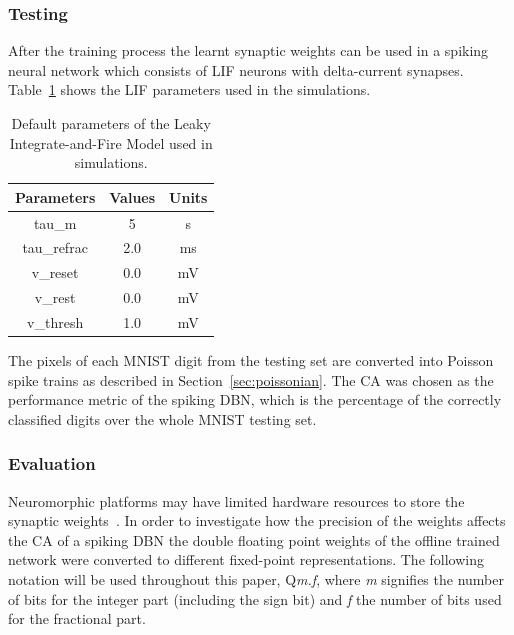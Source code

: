 \documentclass{frontiersENG} %
\begin{document}
\subsubsection{Testing}
After the training process the learnt synaptic weights can be used in a spiking neural network which consists of LIF neurons with delta-current synapses. Table~\ref{Tab:NeuralParams} shows the LIF parameters used in the simulations.

\begin{table}[hbbp]
	\centering
	\caption{\label{Tab:NeuralParams}Default parameters of the Leaky Integrate-and-Fire Model used in simulations.}
	\bgroup
	\def\arraystretch{1.1}
	\begin{tabular}{c|c|c}
		Parameters & Values & Units \\
		\hline
		tau\_m & 5 & s\\
		tau\_refrac & 2.0 & ms\\
		v\_reset & 0.0 & mV\\
		v\_rest & 0.0 & mV\\
		v\_thresh & 1.0 & mV\\
	\end{tabular}
	\egroup
\end{table}

The pixels of each MNIST digit from the testing set are converted into Poisson spike trains as described in Section~\ref{sec:poissonian}. %
The CA was chosen as the performance metric of the spiking DBN, which is the percentage of the correctly classified digits over the whole MNIST testing set.

\subsubsection{Evaluation}
Neuromorphic platforms may have limited hardware resources to store the synaptic weights~\citep{schemmel2010wafer,merolla2014million}. In order to investigate how the precision of the weights affects the CA of a spiking DBN the double floating point weights of the offline trained network were converted to different fixed-point representations. The following notation will be used throughout this paper, Q\textit{m.f}, where \textit{m} signifies the number of bits for the integer part (including the sign bit) and \textit{f} the number of bits used for the fractional part.
\end{document}
